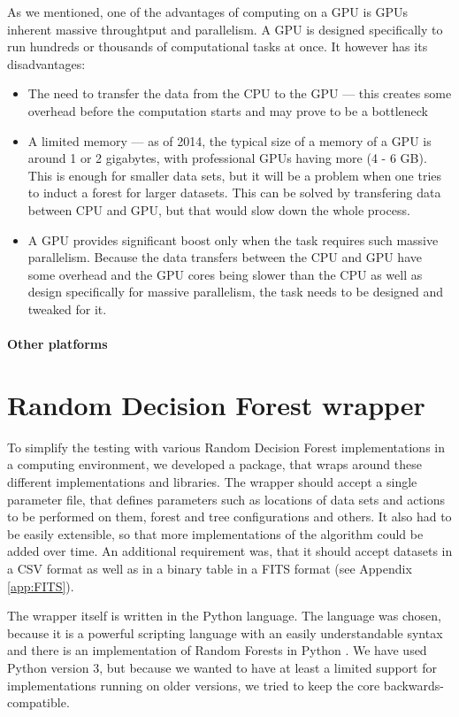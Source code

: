 \documentclass[thesis=B,english]{FITthesis}[2012/10/20]
\begin{document}
	As we mentioned, one of the advantages of computing on a GPU is GPUs inherent massive throughtput and parallelism. A GPU is designed specifically to run hundreds or thousands of computational tasks at once. It however has its disadvantages: 
	\begin{itemize}
	\item The need to transfer the data from the CPU to the GPU --- this creates some overhead before the computation starts and may prove to be a bottleneck
	\item A limited memory --- as of 2014, the typical size of a memory of a GPU is around 1 or 2 gigabytes, with professional GPUs having more (4 - 6 GB). This is enough for smaller data sets, but it will be a problem when one tries to induct a forest for larger datasets. This can be solved by transfering data between CPU and GPU, but that would slow down the whole process.
	\item A GPU provides significant boost only when the task requires such massive parallelism. Because the data transfers between the CPU and GPU have some overhead and the GPU cores being slower than the CPU as well as design specifically for massive parallelism, the task needs to be designed and tweaked for it.
	\end{itemize}

	\subsubsection{Other platforms}

\chapter{Random Decision Forest wrapper}
\label{chap:wrapper}
To simplify the testing with various Random Decision Forest implementations in a computing environment, we developed a package, that wraps around these different implementations and libraries. The wrapper should accept a single parameter file, that defines parameters such as locations of data sets and actions to be performed on them, forest and tree configurations and others. It also had to be easily extensible, so that more implementations of the algorithm could be added over time. An additional requirement was, that it should accept datasets in a CSV format as well as in a binary table in a FITS format (see Appendix \ref{app:FITS}).

The wrapper itself is written in the Python language. The language was chosen, because it is a powerful scripting language with an easily understandable syntax and there is an implementation of Random Forests in Python \cite{scikit-learn}. We have used Python version 3, but because we wanted to have at least a limited support for implementations running on older versions, we tried to keep the core backwards-compatible.
\end{document}
